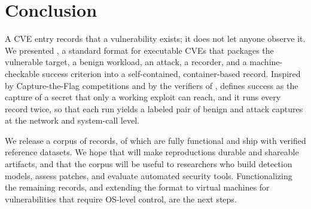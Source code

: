 \section{Conclusion}
\label{sec:conclusion}

A CVE entry records that a vulnerability exists; it does not let anyone
observe it. We presented \cvexthree, a standard format for executable CVEs
that packages the vulnerable target, a benign workload, an attack, a
recorder, and a machine-checkable success criterion into a self-contained,
container-based record. Inspired by Capture-the-Flag competitions and by the
verifiers of \genie, \cvexthree defines success as the capture of a secret
that only a working exploit can reach, and it runs every record twice, so
that each run yields a labeled pair of benign and attack captures at the
network and system-call level.

We release a corpus of \NumRecords records, \NumFunctional of which are
fully functional and ship with verified reference datasets. We hope that
\cvex will make reproductions durable and shareable artifacts, and that the
corpus will be useful to researchers who build detection models, assess
patches, and evaluate automated security tools. Functionalizing the
remaining records, and extending the format to virtual machines for
vulnerabilities that require OS-level control, are the next steps.
